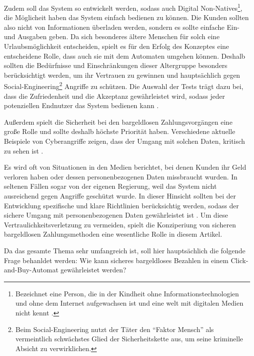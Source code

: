 Zudem soll das System so entwickelt werden, sodass auch Digital Non-Natives\footnote{Bezeichnet
eine Person, die in der Kindheit ohne Informationstechnologien und ohne dem Internet aufgewachsen ist 
und eine welt mit digitalen Medien nicht kennt \cite{misc:MSND}.}, die Möglicheit \cite{refart:QWDN} haben
das System einfach bedienen zu können. Die Kunden sollten also nicht von Informationen überladen werden, 
sondern es sollte einfache Ein- und Ausgaben geben. Da sich besonderes ältere Menschen für solch eine 
Urlaubsmöglichkeit entscheiden, spielt es für den Erfolg des Konzeptes eine entscheidene Rolle, dass auch
sie mit dem Automaten umgehen können. Deshalb sollten die Bedürfnisse und Einschränkungen dieser Altergruppe
besonders berücksichtigt werden, um ihr Vertrauen zu gewinnen \cite{refart:HLAU} und hauptsächlich gegen
Social-Engineering\footnote{Beim Social-Engineering nutzt der Täter den ``Faktor Mensch'' als vermeintlich 
schwächstes Glied der Sicherheitskette aus, um seine kriminelle Absicht zu verwirklichen.\cite{booklet:BSSE}} 
Angriffe zu schützen. Die Auswahl der Tests trägt dazu bei, dass die Zufriedenheit und die Akzeptanz
gewährleistet wird, sodass jeder potenziellen Endnutzer das System bedienen kann \cite{refbook:IASE}.

Außerdem spielt die Sicherheit bei den bargeldlosen Zahlungsvorgängen eine große Rolle und sollte
deshalb höchste Priorität haben. Verschiedene aktuelle Beispiele von Cyberangriffe zeigen, dass der 
Umgang mit solchen Daten, kritisch zu sehen ist \cite{booklet:BKCB}. 

Es wird oft von Situationen in den Medien berichtet, bei denen Kunden ihr Geld verloren haben oder dessen
personenbezogenen Daten missbraucht wurden. In seltenen Fällen sogar von der eigenen Regierung, weil das System 
nicht ausreichend gegen Angriffe geschützt wurde. In dieser Hinsicht sollten bei der Entwicklung spezifische 
und klare Richtlinien berücksichtig werden, sodass der sichere Umgang mit personenbezogenen Daten gewährleistet ist 
\cite{refart:TRVR}. Um diese Vertraulichkeitsverletzung zu vermeiden, spielt die Konziperiung von sicheren 
bargeldlosen Zahlungsmethoden eine wesentliche Rolle in diesem Artikel. 

Da das gesamte Thema sehr umfangreich ist, soll hier hauptsächlich die folgende Frage behanldet werden: 
Wie kann sicheres bargeldloses Bezahlen in einem Click-and-Buy-Automat gewährleistet werden?